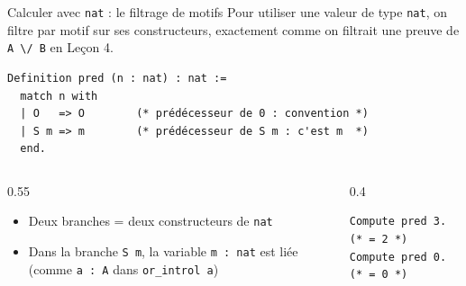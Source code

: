 \documentclass[aspectratio=169]{beamer}
\begin{document}
\begin{frame}[fragile]{Calculer avec \texttt{nat} : le filtrage de motifs}
  Pour utiliser une valeur de type \texttt{nat}, on filtre par motif sur ses constructeurs,
  exactement comme on filtrait une preuve de \texttt{A \textbackslash/ B} en Leçon 4.

\begin{verbatim}
Definition pred (n : nat) : nat :=
  match n with
  | O   => O        (* prédécesseur de 0 : convention *)
  | S m => m        (* prédécesseur de S m : c'est m  *)
  end.
\end{verbatim}
  \pause
  \medskip
  \begin{columns}
    \begin{column}{0.55\textwidth}
      \begin{itemize}
        \item Deux branches = deux constructeurs de \texttt{nat}
        \item Dans la branche \texttt{S m}, la variable \texttt{m : nat}
          est liée (comme \texttt{a : A} dans \texttt{or\_introl a})
      \end{itemize}
    \end{column}
    \begin{column}{0.4\textwidth}
\begin{verbatim}
Compute pred 3.  (* = 2 *)
Compute pred 0.  (* = 0 *)
\end{verbatim}
    \end{column}
  \end{columns}
\end{frame}
\end{document}
